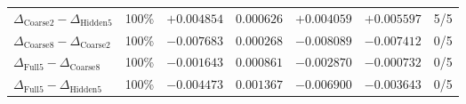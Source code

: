 \begin{table}[!htbp]
\begin{tabular}{llrrrrr}
\midrule
$\Delta_{\mathrm{Coarse2}}-\Delta_{\mathrm{Hidden5}}$ & 100\% & $+0.004854$ & $0.000626$ & $+0.004059$ & $+0.005597$ & 5/5 \\
$\Delta_{\mathrm{Coarse8}}-\Delta_{\mathrm{Coarse2}}$ & 100\% & $-0.007683$ & $0.000268$ & $-0.008089$ & $-0.007412$ & 0/5 \\
$\Delta_{\mathrm{Full5}}-\Delta_{\mathrm{Coarse8}}$ & 100\% & $-0.001643$ & $0.000861$ & $-0.002870$ & $-0.000732$ & 0/5 \\
$\Delta_{\mathrm{Full5}}-\Delta_{\mathrm{Hidden5}}$ & 100\% & $-0.004473$ & $0.001367$ & $-0.006900$ & $-0.003643$ & 0/5 \\
\bottomrule
\end{tabular}
\end{table}
